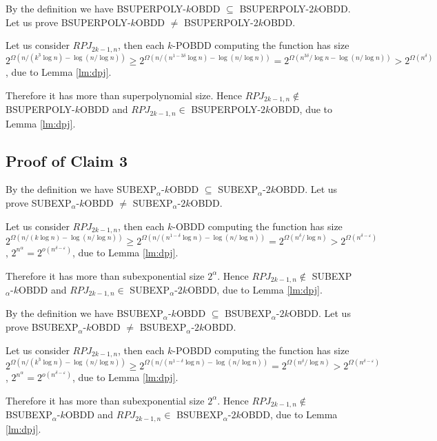 \documentclass{llncs}
\begin{document}
 
 By the definition we have BSUPERPOLY-$k$OBDD $\subseteq$ BSUPERPOLY-$2k$OBDD. Let us prove BSUPERPOLY-$k$OBDD $\neq$ BSUPERPOLY-$2k$OBDD.  

Let us consider $RPJ_{2k-1,n}$, then each $k$-POBDD computing the function has size  
$2^{\Omega( n/(k^3\log n)  - \log(n/\log n))}\geq  
2^{\Omega(n/(n^{1-3\delta} \log n) -\log (n/\log n))}=2^{\Omega(n^{3\delta}/\log n -\log (n/\log n))}
>2^{\Omega(n^{\delta})}$, due to Lemma \ref{lm:dpj}.

 Therefore it has more than superpolynomial size. Hence $RPJ_{2k-1,n}\not\in$ BSUPERPOLY-$k$OBDD and $RPJ_{2k-1,n}\in$ BSUPERPOLY-$2k$OBDD, 
 due to Lemma \ref{lm:dpj}.

\subsection{Proof of Claim 3}
By the definition we have SUBEXP$_{\alpha}$-$k$OBDD $\subseteq$ SUBEXP$_{\alpha}$-$2k$OBDD. Let us prove SUBEXP$_{\alpha}$-$k$OBDD $\neq$ SUBEXP$_{\alpha}$-$2k$OBDD.  

Let us consider $RPJ_{2k-1,n}$, then each $k$-OBDD computing the function has size  
$2^{\Omega(n/(k\log n)-\log (n/\log n))}\geq  
2^{\Omega(n/(n^{1-\delta} \log n)-\log (n/\log n))}=2^{\Omega(n^{\delta}/\log n)}
>2^{\Omega(n^{\delta-\varepsilon})}$, $2^{n^{\alpha}}=2^{o(n^{\delta-\varepsilon})}$, due to Lemma \ref{lm:dpj}.

 Therefore it has more than subexponential size $2^{\alpha}$. Hence $RPJ_{2k-1,n}\not\in$  SUBEXP$_{\alpha}$-$k$OBDD and $RPJ_{2k-1,n}\in$  SUBEXP$_{\alpha}$-$2k$OBDD, 
 due to Lemma \ref{lm:dpj}.
  
  
By the definition we have BSUBEXP$_{\alpha}$-$k$OBDD $\subseteq$ BSUBEXP$_{\alpha}$-$2k$OBDD. Let us prove BSUBEXP$_{\alpha}$-$k$OBDD $\neq$ BSUBEXP$_{\alpha}$-$2k$OBDD.  

Let us consider $RPJ_{2k-1,n}$, then each $k$-POBDD computing the function has size  
$2^{\Omega( n/(k^3\log n)  - \log(n/\log n))}\geq  
2^{\Omega(n/(n^{1-\delta} \log n)-\log (n/\log n))}=2^{\Omega(n^{\delta}/\log n)}
>2^{\Omega(n^{\delta-\varepsilon})}$, $2^{n^{\alpha}}=2^{o(n^{\delta-\varepsilon})}$, due to Lemma \ref{lm:dpj}.

 Therefore it has more than subexponential size $2^{\alpha}$. Hence $RPJ_{2k-1,n}\not\in$  BSUBEXP$_{\alpha}$-$k$OBDD and $RPJ_{2k-1,n}\in$  BSUBEXP$_{\alpha}$-$2k$OBDD, 
 due to Lemma \ref{lm:dpj}.
    
\end{document}
